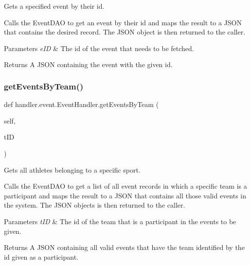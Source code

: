 Gets a specified event by their id. 

Calls the Event\+D\+AO to get an event by their id and maps the result to a J\+S\+ON that contains the desired record. The J\+S\+ON object is then returned to the caller.


\begin{DoxyParams}{Parameters}
{\em e\+ID} & The id of the event that needs to be fetched.\\
\hline
\end{DoxyParams}
\begin{DoxyReturn}{Returns}
A J\+S\+ON containing the event with the given id. 
\end{DoxyReturn}
\mbox{\label{classhandler_1_1event_1_1_event_handler_a0b5135c2269c49c58f165e428d7976fd}} 
\subsubsection{\texorpdfstring{get\+Events\+By\+Team()}{getEventsByTeam()}}
{\footnotesize\ttfamily def handler.\+event.\+Event\+Handler.\+get\+Events\+By\+Team (\begin{DoxyParamCaption}\item[{}]{self,  }\item[{}]{t\+ID }\end{DoxyParamCaption})}



Gets all athletes belonging to a specific sport. 

Calls the Event\+D\+AO to get a list of all event records in which a specific team is a participant and maps the result to a J\+S\+ON that contains all those valid events in the system. The J\+S\+ON objects is then returned to the caller.


\begin{DoxyParams}{Parameters}
{\em t\+ID} & The id of the team that is a participant in the events to be given.\\
\hline
\end{DoxyParams}
\begin{DoxyReturn}{Returns}
A J\+S\+ON containing all valid events that have the team identified by the id given as a participant. 
\end{DoxyReturn}
\mbox{\label{classhandler_1_1event_1_1_event_handler_a511281731fc33fae52d80e432680692d}} 

